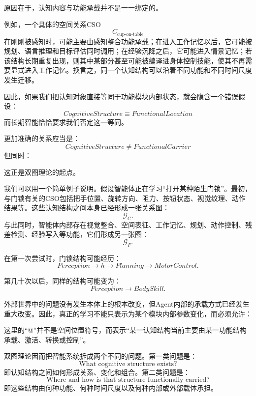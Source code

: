 原因在于，认知内容与功能承载并不是一一绑定的。

例如，一个具体的空间关系CSO
\[
C_{\text{cup-on-table}}
\]
在刚刚被感知时，可能主要由感知整合功能承载；在进入工作记忆以后，它可能被规划、语言推理和目标评估同时调用；在经验沉降之后，它可能进入情景记忆；若该结构长期重复出现，则其中某部分甚至可能被编译进身体控制技能，使其不再需要显式进入工作记忆。换言之，同一个认知结构可以沿着不同功能和不同时间尺度发生迁移。

因此，如果我们把认知对象直接等同于功能模块内部状态，就会隐含一个错误假设：
\[
\boxed{
CognitiveStructure
\equiv
FunctionalLocation
}
\]
而长期智能恰恰要求我们否定这一等同。

更加准确的关系应当是：
\[
\boxed{
CognitiveStructure
\neq
FunctionalCarrier
}
\]
但同时：
\begin{statementbox}
\centering
{}
\end{statementbox}

这正是双图理论的起点。

我们可以用一个简单例子说明。假设智能体正在学习“打开某种陌生门锁”。最初，与门锁有关的CSO包括把手位置、旋转方向、阻力、按钮状态、视觉纹理、动作结果等。这些认知结构之间本身已经形成一张关系图：
\[
\mathcal G_C.
\]
与此同时，智能体内部存在视觉整合、空间表征、工作记忆、规划、动作控制、残差检测、经验写入等功能，它们形成另一张图：
\[
\mathcal G_F.
\]

在第一次尝试时，门锁结构可能经历：
\[
Perception
\rightarrow
h
\rightarrow
Planning
\rightarrow
MotorControl.
\]

第几十次以后，同样的结构可能变为：
\[
Perception
\rightarrow
BodySkill.
\]

外部世界中的问题没有发生本体上的根本改变，但Agent内部的承载方式已经发生重大改变。因此，真正的学习不能只表示为某个模块内部参数变化，而必须允许：
\begin{statementbox}
\centering
{}
\end{statementbox}

这里的“@”并不是空间位置符号，而表示“某一认知结构当前主要由某一功能结构承载、激活、转换或控制”。

双图理论因而把智能系统拆成两个不同的问题。第一类问题是：
\[
\text{What cognitive structure exists?}
\]
即认知结构之间如何形成关系、变化和组合。第二类问题是：
\[
\text{Where and how is that structure functionally carried?}
\]
即这些结构由何种功能、何种时间尺度以及何种内部或外部载体承担。

